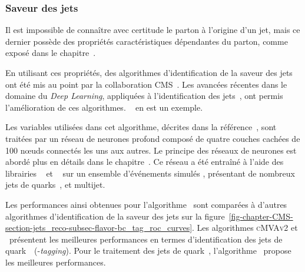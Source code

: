 \subsubsection{Saveur des jets}\label{chapter-CMS-section-jets_reco-subsec-flavor}
Il est impossible de connaître avec certitude le parton à l'origine d'un jet,
mais ce dernier possède des propriétés caractéristiques dépendantes du parton, comme exposé dans le chapitre~.
\par
En utilisant ces propriétés, des algorithmes d'identification de la saveur des jets ont été mis au point par la collaboration CMS~\cite{jet_btag_CSV_RunI}.
Les avancées récentes dans le domaine du \emph{Deep Learning}, appliquées à l'identification des jets~\cite{jet_flavor_deep_nn}, ont permis l'amélioration de ces algorithmes.
\DeepCSV~\cite{Sirunyan_heavy_flavor_jets_2018} en est un exemple.
\par Les variables utilisées dans cet algorithme, décrites dans la référence~\cite{Sirunyan_heavy_flavor_jets_2018},
sont traitées par un réseau de neurones profond composé de quatre couches cachées de 100 nœuds connectés les uns aux autres.
Le principe des réseaux de neurones est abordé plus en détails dans le chapitre~.
Ce réseau a été entraîné à l'aide des librairies
\KERAS~\cite{keras}
et
\TENSORFLOW~\cite{tensorflow}
sur un ensemble d'événements simulés \ttbar, présentant de nombreux jets de quarks~\quarkb, et multijet.
\par Les performances ainsi obtenues pour l'algorithme \DeepCSV\ sont comparées à d'autres algorithmes d'identification de la saveur des jets sur la figure~\ref{fig-chapter-CMS-section-jets_reco-subsec-flavor-bc_tag_roc_curves}.
Les algorithmes \textsc{cMVAv2} et \DeepCSV\ présentent les meilleures performances en termes d'identification des jets de quark~\quarkb\ (\quarkb-\emph{tagging}).
Pour le traitement des jets de quark~\quarkc, l'algorithme \DeepCSV\ propose les meilleures performances.
